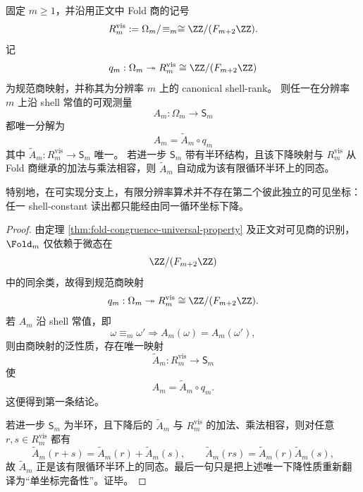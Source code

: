 \begin{proposition}[有限分辨率算术的单坐标完备性]\label{prop:conclusion-serrin-shell-rank-single-coordinate-completeness}
固定 \(m\ge 1\)，并沿用正文中 Fold 商的记号
\[
R_m^{\mathrm{vis}}:=\Omega_m/\!\equiv_m\cong \ZZ/(F_{m+2}\ZZ).
\]
记
\[
q_m:\Omega_m\twoheadrightarrow R_m^{\mathrm{vis}}\cong \ZZ/(F_{m+2}\ZZ)
\]
为规范商映射，并称其为分辨率 \(m\) 上的 canonical shell-rank。
则任一在分辨率 \(m\) 上沿 shell 常值的可观测量
\[
A_m:\Omega_m\to \mathsf S_m
\]
都唯一分解为
\[
A_m=\widetilde A_m\circ q_m
\]
其中 \(\widetilde A_m:R_m^{\mathrm{vis}}\to \mathsf S_m\) 唯一。
若进一步 \(\mathsf S_m\) 带有半环结构，且该下降映射与 \(R_m^{\mathrm{vis}}\) 从 Fold 商继承的加法与乘法相容，则 \(\widetilde A_m\) 自动成为该有限循环半环上的同态。

特别地，在可实现分支上，有限分辨率算术并不存在第二个彼此独立的可见坐标：任一 shell-constant 读出都只能经由同一循环坐标下降。
\end{proposition}
\begin{proof}
由定理 \ref{thm:fold-congruence-universal-property} 及正文对可见商的识别，\(\Fold_m\) 仅依赖于微态在
\[
\ZZ/(F_{m+2}\ZZ)
\]
中的同余类，故得到规范商映射
\[
q_m:\Omega_m\twoheadrightarrow R_m^{\mathrm{vis}}\cong \ZZ/(F_{m+2}\ZZ).
\]
若 \(A_m\) 沿 shell 常值，即
\[
\omega\equiv_m \omega'
\Longrightarrow
A_m(\omega)=A_m(\omega'),
\]
则由商映射的泛性质，存在唯一映射
\[
\widetilde A_m:R_m^{\mathrm{vis}}\to \mathsf S_m
\]
使
\[
A_m=\widetilde A_m\circ q_m.
\]
这便得到第一条结论。

若进一步 \(\mathsf S_m\) 为半环，且下降后的 \(\widetilde A_m\) 与 \(R_m^{\mathrm{vis}}\) 的加法、乘法相容，则对任意 \(r,s\in R_m^{\mathrm{vis}}\) 都有
\[
\widetilde A_m(r+s)=\widetilde A_m(r)+\widetilde A_m(s),
\qquad
\widetilde A_m(rs)=\widetilde A_m(r)\widetilde A_m(s),
\]
故 \(\widetilde A_m\) 正是该有限循环半环上的同态。最后一句只是把上述唯一下降性质重新翻译为“单坐标完备性”。证毕。
\end{proof}

